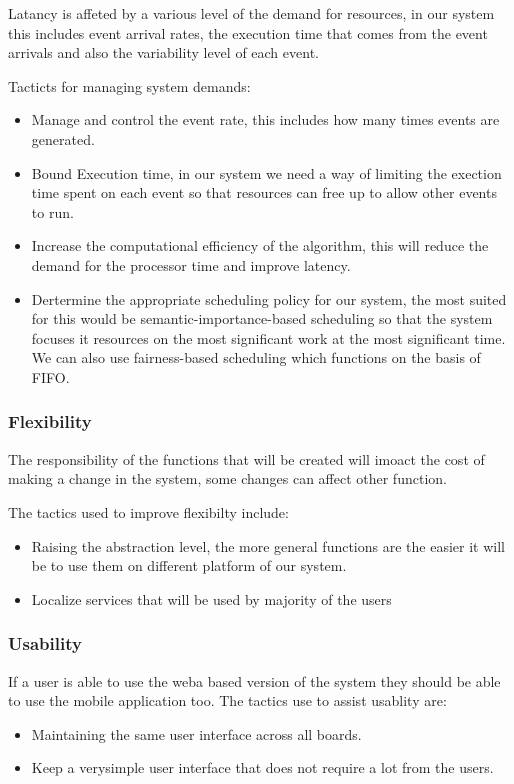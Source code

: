\documentclass[a4paper,12pt]{report}
\begin{document}
Latancy is affeted by a various level of the demand for resources, in our system this includes event arrival rates, the execution time that comes from the event arrivals and also the variability level of each event.

Tacticts for managing system demands:
\begin{itemize}
\item Manage and control the event rate, this includes how many times events are generated.

\item Bound Execution time, in our system we need a way of limiting the exection time spent on each event so that resources can free up to allow other events to run.

\item Increase the computational efficiency of the algorithm, this will reduce the demand for the processor time and improve latency.

\item Dertermine the appropriate scheduling policy for our system, the most suited for this would be semantic-importance-based scheduling so that the system focuses it resources on the most significant work at the most significant time. We can also use fairness-based scheduling  which functions on the basis of FIFO.
\end{itemize}
\subsubsection{Flexibility} 

The responsibility of the functions that will be created will imoact the cost of making a change in the system, some changes can affect other function.
 
The tactics used to improve flexibilty include:
\begin{itemize}
\item Raising the abstraction level, the more general functions are the easier it will be to use them on different platform of our system.

\item Localize services that will be used by majority of the users
\end{itemize}
\subsubsection{Usability} 

If a user is able to use the weba based version of the system they should be able to use the mobile application too.
The tactics use to assist usablity are:
\begin{itemize}
\item Maintaining the same user interface across all boards.
\item Keep a verysimple user interface that does not require a lot from the users.
\end{itemize}
\end{document}
